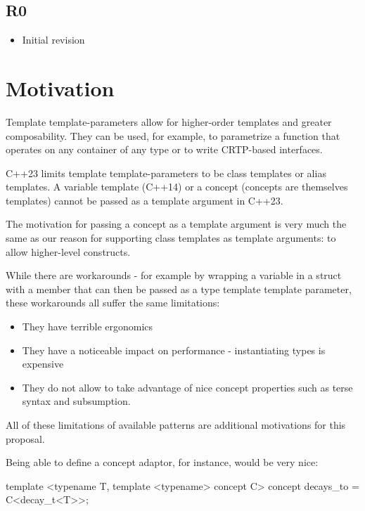 \documentclass{wg21}
\begin{document}
\subsection{R0}

\begin{itemize}
    \item{Initial revision}
\end{itemize}



\section{Motivation}

Template template-parameters allow for higher-order templates and greater composability.
They can be used, for example, to parametrize a function that operates on any container of any type or to write CRTP-based interfaces.

C++23 limits template template-parameters to be class templates or alias templates.
A variable template (C++14) or a concept (concepts are themselves templates) cannot be passed as a template argument in C++23.

The motivation for passing a concept as a template argument is very much the same as our reason for supporting class templates as template arguments: to allow higher-level constructs.

While there are workarounds - for example by wrapping a variable in a struct with a  member that can then be passed as a type template template parameter, these workarounds
all suffer the same limitations:

\begin{itemize}
    \item They have terrible ergonomics
    \item They have a noticeable impact on performance - instantiating types is expensive
    \item They do not allow to take advantage of nice concept properties such as terse syntax and subsumption.
\end{itemize}

All of these limitations of available patterns are additional motivations for this proposal.


Being able to define a concept adaptor, for instance, would be very nice:

\begin{colorblock}
template <typename T, template <typename> concept C>
concept decays_to = C<decay_t<T>>;
\end{colorblock}
\end{document}
